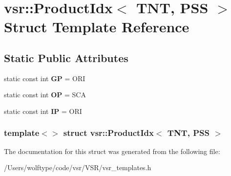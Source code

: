 \hypertarget{structvsr_1_1_product_idx_3_01_t_n_t_00_01_p_s_s_01_4}{\section{vsr\-:\-:Product\-Idx$<$ T\-N\-T, P\-S\-S $>$ Struct Template Reference}
\label{structvsr_1_1_product_idx_3_01_t_n_t_00_01_p_s_s_01_4}
}
\subsection*{Static Public Attributes}
\begin{DoxyCompactItemize}
\item 
\hypertarget{structvsr_1_1_product_idx_3_01_t_n_t_00_01_p_s_s_01_4_a401a257bfe09f9e52a4ef535e4eb3117}{static const int {\bfseries G\-P} = O\-R\-I}\label{structvsr_1_1_product_idx_3_01_t_n_t_00_01_p_s_s_01_4_a401a257bfe09f9e52a4ef535e4eb3117}

\item 
\hypertarget{structvsr_1_1_product_idx_3_01_t_n_t_00_01_p_s_s_01_4_a6a86e964d6f4fc71e3da65c94efbe3fb}{static const int {\bfseries O\-P} = S\-C\-A}\label{structvsr_1_1_product_idx_3_01_t_n_t_00_01_p_s_s_01_4_a6a86e964d6f4fc71e3da65c94efbe3fb}

\item 
\hypertarget{structvsr_1_1_product_idx_3_01_t_n_t_00_01_p_s_s_01_4_a247a104a610b426a407dd46bc72207a7}{static const int {\bfseries I\-P} = O\-R\-I}\label{structvsr_1_1_product_idx_3_01_t_n_t_00_01_p_s_s_01_4_a247a104a610b426a407dd46bc72207a7}

\end{DoxyCompactItemize}
\subsubsection*{template$<$$>$ struct vsr\-::\-Product\-Idx$<$ T\-N\-T, P\-S\-S $>$}



The documentation for this struct was generated from the following file\-:\begin{DoxyCompactItemize}
\item 
/\-Users/wolftype/code/vsr/\-V\-S\-R/vsr\-\_\-templates.\-h\end{DoxyCompactItemize}
